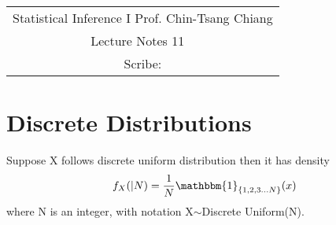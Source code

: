 \documentclass[../Distributions.tex]{subfiles}
\begin{document}
	\begin{center}
		\renewcommand{\arraystretch}{2}
		\begin{bfseries}
			\begin{tabular}{|c|}
				\hline
				Statistical Inference I \hfill Prof. Chin-Tsang Chiang\\
				\hspace{15em} {\large Lecture Notes 11} \hspace{15em}\ \\
				\lecdate \hfill Scribe: \scribe\\
				\hline
			\end{tabular}
			\renewcommand{\arraystretch}{1}
		\end{bfseries}
	\end{center}
	
\section{Discrete Distributions}

\begin{definition}Suppose X follows discrete uniform distribution then it has density $$f_X(|N)=\frac{1}{N}\mathbbm{1}_{\{1,2,3...N\}}(x)$$
where N is an integer, with notation X$\sim$Discrete Uniform(N).
\end{definition}
\end{document}
